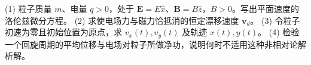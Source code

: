 (1) 粒子质量 \(m\)、电量 \(q>0\)，处于 \(\boldsymbol E=E\hat x\)、\(\boldsymbol B=B\hat z\)，\(B>0\)。写出平面速度的洛伦兹微分方程。
(2) 求使电场力与磁力恰抵消的恒定漂移速度 \(\boldsymbol v_d\)。
(3) 令粒子初速为零且初始位置为原点，求 \(v_x(t),v_y(t)\) 及轨迹 \(x(t),y(t)\)。
(4) 检验一个回旋周期的平均位移与电场对粒子所做净功，说明何时不适用这种非相对论解析解。
